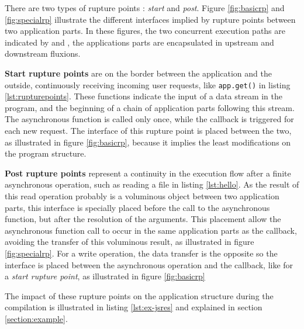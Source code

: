 There are two types of rupture points : \textit{start} and \textit{post}.
Figure \ref{fig:basicrp} and \ref{fig:specialrp} illustrate the different interfaces implied by rupture points between two application parts.
In these figures, the two concurrent execution paths are indicated by  and , the applications parts are encapsulated in upstream and downstream fluxions.

\textbf{Start rupture points} are on the border between the application and the outside, continuously receiving incoming user requests, like \texttt{app.get()} in listing \ref{lst:rupturepoints}.
These functions indicate the input of a data stream in the program, and the beginning of a chain of application parts following this stream.
The asynchronous function is called only once, while the callback is triggered for each new request.
The interface of this rupture point is placed between the two, as illustrated in figure \ref{fig:basicrp}, because it implies the least modifications on the program structure.

\textbf{Post rupture points} represent a continuity in the execution flow after a finite asynchronous operation, such as reading a file in listing \ref{lst:hello}.
As the result of this read operation probably is a voluminous object between two application parts, this interface is specially placed before the call to the asynchronous function, but after the resolution of the arguments.
This placement allow the asynchronous function call to occur in the same application parts as the callback, avoiding the transfer of this voluminous result, as illustrated in figure \ref{fig:specialrp}.
For a write operation, the data transfer is the opposite so the interface is placed between the asynchronous operation and the callback, like for a \textit{start rupture point}, as illustrated in figure \ref{fig:basicrp}

The impact of these rupture points on the application structure during the compilation is illustrated in listing \ref{lst:ex-jsres} and explained in section \ref{section:example}.

